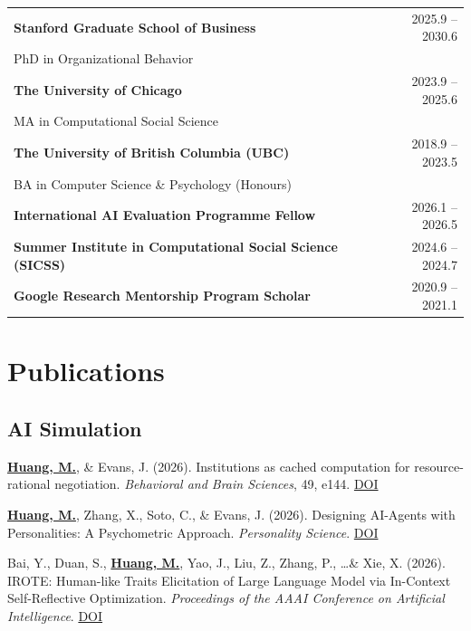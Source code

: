 \documentclass[11pt,letterpaper]{article}
\newcommand{\myname}[1]{\textbf{\uline{#1}}}
\newcommand{\institution}[1]{\textcolor{linkblue}{\textbf{#1}}}
\begin{document}
\noindent
\begin{tabularx}{\textwidth}{Xr}
\institution{Stanford Graduate School of Business} & 2025.9 -- 2030.6 \\
\quad PhD in Organizational Behavior & \\[0.5em]
\institution{The University of Chicago} & 2023.9 -- 2025.6 \\
\quad MA in Computational Social Science & \\[0.5em]
\institution{The University of British Columbia (UBC)} & 2018.9 -- 2023.5 \\
\quad BA in Computer Science \& Psychology (Honours) & \\[0.5em]
\institution{International AI Evaluation Programme Fellow} & 2026.1 -- 2026.5 \\[0.5em]
\institution{Summer Institute in Computational Social Science (SICSS)} & 2024.6 -- 2024.7 \\[0.5em]
\institution{Google Research Mentorship Program Scholar} & 2020.9 -- 2021.1 \\
\end{tabularx}

\section*{Publications}

\subsection*{AI Simulation}
\begin{enumerate}[label={[\arabic*]}]
    \item \myname{Huang, M.}, \& Evans, J. (2026). Institutions as cached computation for resource-rational negotiation. \textit{Behavioral and Brain Sciences}, 49, e144. \href{https://doi.org/10.1017/S0140525X2510174X}{DOI}
    \item \myname{Huang, M.}, Zhang, X., Soto, C., \& Evans, J. (2026). Designing AI-Agents with Personalities: A Psychometric Approach. \textit{Personality Science}. \href{https://doi.org/10.1177/27000710251406471}{DOI}
    \item Bai, Y., Duan, S., \myname{Huang, M.}, Yao, J., Liu, Z., Zhang, P., \ldots \& Xie, X. (2026). IROTE: Human-like Traits Elicitation of Large Language Model via In-Context Self-Reflective Optimization. \textit{Proceedings of the AAAI Conference on Artificial Intelligence}. \href{https://doi.org/10.1609/aaai.v40i36.40252}{DOI}
\end{enumerate}
\end{document}

